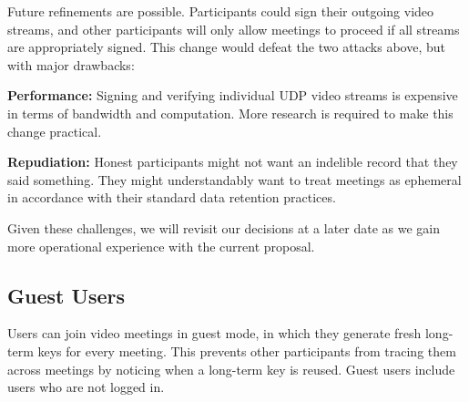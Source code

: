 Future refinements are possible. Participants could sign their outgoing video streams, and other participants will only allow meetings to proceed if all streams are appropriately signed. This change would defeat the two attacks above, but with major drawbacks:
%
\begin{description}
    \item {\bf Performance:} Signing and verifying individual UDP video streams is expensive in terms of bandwidth and computation. More research is required to make this change practical.
    \item {\bf Repudiation:} Honest participants might not want an indelible record that they said something. They might understandably want to treat meetings as ephemeral in accordance with their standard data retention practices.
\end{description}

Given these challenges, we will revisit our decisions at a later date as we gain more operational experience with the current proposal.

\subsection{Guest Users}
Users can join video meetings in guest mode, in which they generate fresh long-term keys for every meeting. This prevents other participants from tracing them across meetings by noticing when a long-term key is reused. Guest users include users who are not logged in.

